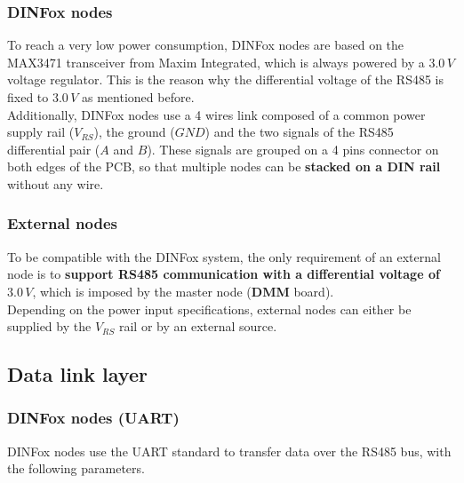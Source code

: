 \subsubsection{DINFox nodes} \label{dinfox-rs485}

To reach a very low power consumption, DINFox nodes are based on the MAX3471 transceiver from Maxim Integrated, which is always powered by a $ 3.0\,V $ voltage regulator. This is the reason why the differential voltage of the RS485 is fixed to $ 3.0\,V $ as mentioned before.
\medskip \\
Additionally, DINFox nodes use a 4 wires link composed of a common power supply rail ($ V_{RS} $), the ground ($ GND $) and the two signals of the RS485 differential pair ($ A $ and $ B $). These signals are grouped on a 4 pins connector on both edges of the PCB, so that multiple nodes can be \textbf{stacked on a DIN rail} without any wire.

\begin{figure}[h]
    \centering
\end{figure}

\subsubsection{External nodes}

To be compatible with the DINFox system, the only requirement of an external node is to \textbf{support RS485 communication with a differential voltage of} $ 3.0\,V $, which is imposed by the master node (\textbf{DMM} board).
\medskip \\
Depending on the power input specifications, external nodes can either be supplied by the $ V_{RS} $ rail or by an external source.

\newpage

\subsection{Data link layer} \label{data-link-layer}

\subsubsection{DINFox nodes (UART)}

DINFox nodes use the UART standard to transfer data over the RS485 bus, with the following parameters. \pfs

